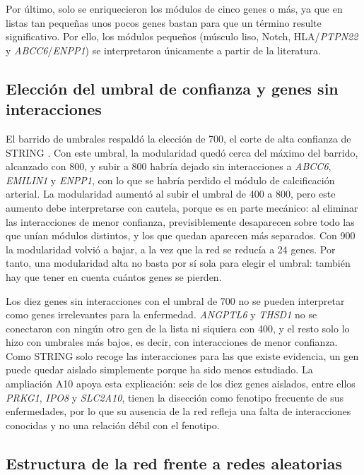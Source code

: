 Por último, solo se enriquecieron los módulos de cinco genes o más, ya que en listas tan pequeñas unos pocos genes bastan para que un término resulte significativo. Por ello, los módulos pequeños (músculo liso, Notch, HLA/\textit{PTPN22} y \textit{ABCC6}/\textit{ENPP1}) se interpretaron únicamente a partir de la literatura.

\subsection{Elección del umbral de confianza y genes sin interacciones}

El barrido de umbrales respaldó la elección de 700, el corte de alta confianza de STRING \cite{Szklarczyk2025}. Con este umbral, la modularidad quedó cerca del máximo del barrido, alcanzado con 800, y subir a 800 habría dejado sin interacciones a \textit{ABCC6}, \textit{EMILIN1} y \textit{ENPP1}, con lo que se habría perdido el módulo de calcificación arterial. La modularidad aumentó al subir el umbral de 400 a 800, pero este aumento debe interpretarse con cautela, porque es en parte mecánico: al eliminar las interacciones de menor confianza, previsiblemente desaparecen sobre todo las que unían módulos distintos, y los que quedan aparecen más separados. Con 900 la modularidad volvió a bajar, a la vez que la red se reducía a 24 genes. Por tanto, una modularidad alta no basta por sí sola para elegir el umbral: también hay que tener en cuenta cuántos genes se pierden.

Los diez genes sin interacciones con el umbral de 700 no se pueden interpretar como genes irrelevantes para la enfermedad. \textit{ANGPTL6} y \textit{THSD1} no se conectaron con ningún otro gen de la lista ni siquiera con 400, y el resto solo lo hizo con umbrales más bajos, es decir, con interacciones de menor confianza. Como STRING solo recoge las interacciones para las que existe evidencia, un gen puede quedar aislado simplemente porque ha sido menos estudiado. La ampliación A10 apoya esta explicación: seis de los diez genes aislados, entre ellos \textit{PRKG1}, \textit{IPO8} y \textit{SLC2A10}, tienen la disección como fenotipo frecuente de sus enfermedades, por lo que su ausencia de la red refleja una falta de interacciones conocidas y no una relación débil con el fenotipo.

\subsection{Estructura de la red frente a redes aleatorias}

